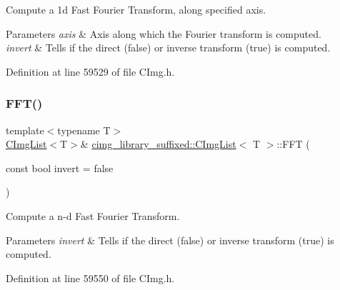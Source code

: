 Compute a 1d Fast Fourier Transform, along specified axis. 


\begin{DoxyParams}{Parameters}
{\em axis} & Axis along which the Fourier transform is computed. \\
\hline
{\em invert} & Tells if the direct ({\ttfamily false}) or inverse transform ({\ttfamily true}) is computed. \\
\hline
\end{DoxyParams}


Definition at line 59529 of file C\+Img.\+h.

\mbox{\label{structcimg__library__suffixed_1_1CImgList_aa37f7088060aaa43e50b33fbde5409bb}} 
\subsubsection{\texorpdfstring{F\+F\+T()}{FFT()}\hspace{0.1cm}{\footnotesize\ttfamily [2/2]}}
{\footnotesize\ttfamily template$<$typename T$>$ \\
\hyperlink{structcimg__library__suffixed_1_1CImgList}{C\+Img\+List}$<$T$>$\& \hyperlink{structcimg__library__suffixed_1_1CImgList}{cimg\+\_\+library\+\_\+suffixed\+::\+C\+Img\+List}$<$ T $>$\+::F\+FT (\begin{DoxyParamCaption}\item[{const bool}]{invert = {\ttfamily false} }\end{DoxyParamCaption})\hspace{0.3cm}{\ttfamily [inline]}}



Compute a n-\/d Fast Fourier Transform. 


\begin{DoxyParams}{Parameters}
{\em invert} & Tells if the direct ({\ttfamily false}) or inverse transform ({\ttfamily true}) is computed. \\
\hline
\end{DoxyParams}


Definition at line 59550 of file C\+Img.\+h.

\mbox{\label{structcimg__library__suffixed_1_1CImgList_aeb4a6463a473fa5935f69534ca1a49c8}} 
